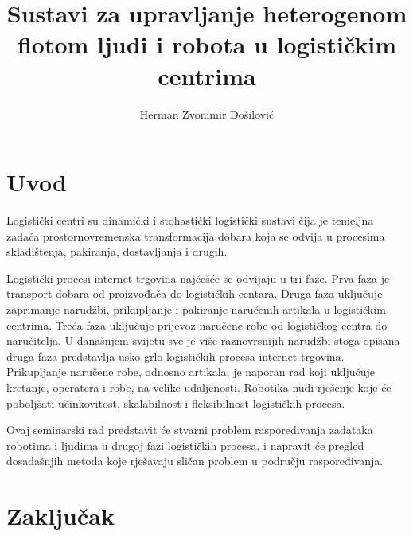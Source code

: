 \documentclass[times, utf8, seminar]{fer}
\begin{document}


\title{
    Sustavi za upravljanje heterogenom flotom ljudi i robota u logističkim centrima
}

\author{Herman Zvonimir Došilović}

\maketitle

\tableofcontents

\chapter{Uvod}
Logistički centri su dinamički i stohastički logistički sustavi
čija je temeljna zadaća prostornovremenska transformacija
dobara koja se odvija u procesima skladištenja, pakiranja, dostavljanja i drugih.
\citep{Paladin, buntak2012medjusobni}

Logistički procesi internet trgovina  najčešće se odvijaju
u tri faze. Prva faza je transport dobara od proizvođača do
logističkih centara. Druga faza uključuje zaprimanje narudžbi, prikupljanje i pakiranje naručenih artikala
u logističkim centrima. Treća faza uključuje prijevoz naručene robe od logističkog centra
do naručitelja. U današnjem svijetu sve je više
raznovrsnijih narudžbi stoga opisana druga faza predstavlja
usko grlo logističkih procesa internet trgovina.
Prikupljanje naručene robe, odnosno artikala, je naporan rad
koji uključuje kretanje, operatera i robe, na velike udaljenosti.
Robotika nudi rješenje koje će poboljšati učinkovitost, skalabilnost
i fleksibilnost logističkih procesa. \citep{huang2015robotics}

Ovaj seminarski rad predstavit će stvarni problem raspoređivanja zadataka
robotima i ljudima u drugoj fazi logističkih procesa, i napravit će
pregled dosadašnjih metoda koje rješavaju sličan problem u području
raspoređivanja.

\chapter{Zaključak}




\begin{sazetak}

\end{sazetak}

\begin{abstract}

\end{abstract}
\end{document}
